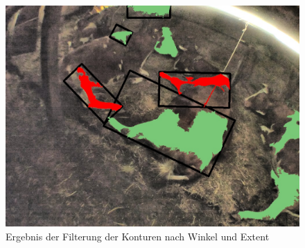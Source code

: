 \begin{figure}[H]
	\center
	\includegraphics[scale=0.43]{Grafiken/entwicklung/25ExtentDemonstration.jpg}
	\caption{Ergebnis der Filterung der Konturen nach Winkel und Extent } 
	\label{fig: Ergebnis der Filterung der Konturen nach Winkel und Extent} 
\end{figure}

